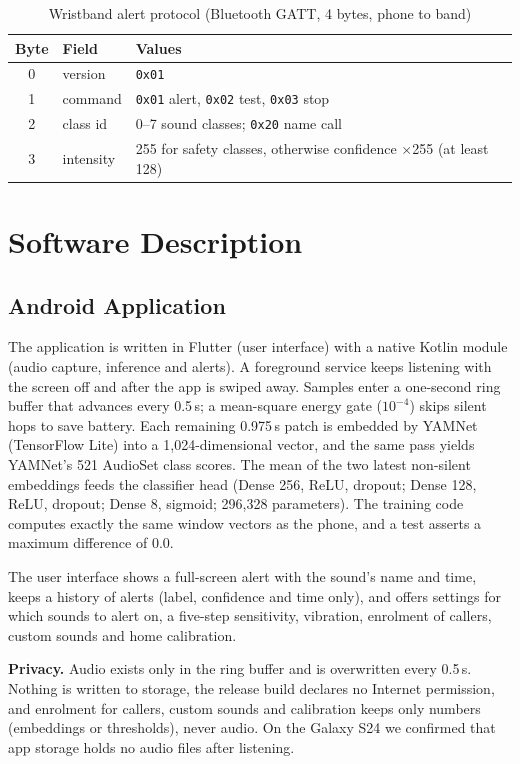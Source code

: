 \documentclass[12pt,a4paper,oneside]{report}
\begin{document}
\begin{table}[h]
\caption{Wristband alert protocol (Bluetooth GATT, 4 bytes, phone to band)}
\label{tab:ble}
\centering\small
\begin{tabular}{@{}clp{8cm}@{}}
\toprule
Byte & Field & Values\\
\midrule
0 & version & \texttt{0x01}\\
1 & command & \texttt{0x01} alert, \texttt{0x02} test, \texttt{0x03} stop\\
2 & class id & 0--7 sound classes; \texttt{0x20} name call\\
3 & intensity & 255 for safety classes, otherwise confidence $\times$255 (at least 128)\\
\bottomrule
\end{tabular}
\end{table}

\section{Software Description}
\subsection{Android Application}
The application is written in Flutter (user interface) with a native Kotlin module (audio capture, inference and alerts). A foreground service keeps listening with the screen off and after the app is swiped away. Samples enter a one-second ring buffer that advances every 0.5\,s; a mean-square energy gate ($10^{-4}$) skips silent hops to save battery. Each remaining 0.975\,s patch is embedded by YAMNet (TensorFlow Lite) into a 1,024-dimensional vector, and the same pass yields YAMNet's 521 AudioSet class scores. The mean of the two latest non-silent embeddings feeds the classifier head (Dense 256, ReLU, dropout; Dense 128, ReLU, dropout; Dense 8, sigmoid; 296,328 parameters). The training code computes exactly the same window vectors as the phone, and a test asserts a maximum difference of 0.0.

The user interface shows a full-screen alert with the sound's name and time, keeps a history of alerts (label, confidence and time only), and offers settings for which sounds to alert on, a five-step sensitivity, vibration, enrolment of callers, custom sounds and home calibration.

\textbf{Privacy.} Audio exists only in the ring buffer and is overwritten every 0.5\,s. Nothing is written to storage, the release build declares no Internet permission, and enrolment for callers, custom sounds and calibration keeps only numbers (embeddings or thresholds), never audio. On the Galaxy S24 we confirmed that app storage holds no audio files after listening.
\end{document}
